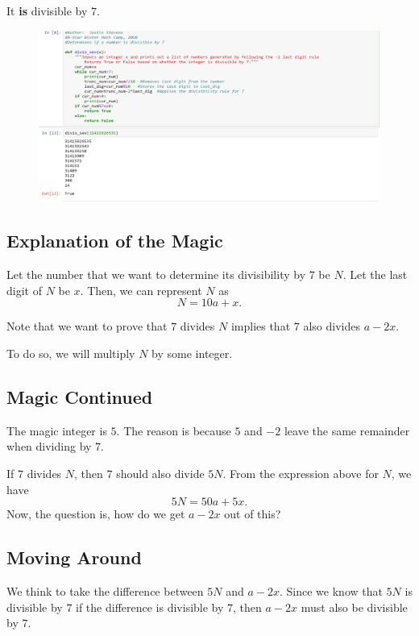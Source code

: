 It \textbf{is} divisible by $7$.

\clearpage

\begin{figure}[h]
	\centering\includegraphics[width=1\linewidth]{images/seven.png}
\end{figure}
\clearpage

\subsection{Explanation of the Magic}

Let the number that we want to determine its divisibility by $7$ be $N$.  Let the last digit of $N$ be $x$.  Then, we can represent $N$ as $$N=10a+x.$$  

Note that we want to prove that $7$ divides $N$ implies that $7$ also divides $a-2x$.  

To do so, we will multiply $N$ by some integer.
\clearpage
\subsection*{Magic Continued}

The magic integer is $5$. The reason is because $5$ and $-2$ leave the same remainder when dividing by $7$.

If $7$ divides $N$, then $7$ should also divide $5N$.  From the expression above for $N$, we have $$5N=50a+5x.$$  Now, the question is, how do we get $a-2x$ out of this?  

\subsection*{Moving Around}

We think to take the difference between $5N$ and $a-2x$.  Since we know that $5N$ is divisible by $7$ if the difference is divisible by $7$, then $a-2x$ must also be divisible by $7$.

